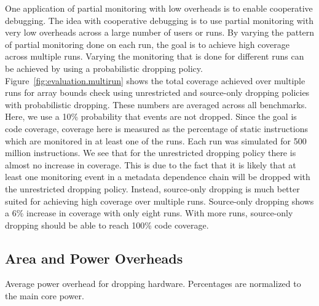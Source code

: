 One application of partial monitoring with low overheads is to enable
cooperative debugging. 
The idea with cooperative debugging is to use partial
monitoring with very low overheads across a large number of users or runs. By
varying the pattern of partial monitoring done on each run, the goal is to
achieve high coverage across multiple runs. Varying the monitoring that is
done for different runs can be achieved by using a probabilistic dropping policy.
Figure~\ref{fig:evaluation.multirun} shows the total
coverage achieved over multiple runs for array bounds check using
unrestricted and source-only dropping policies with probabilistic dropping.
These numbers are averaged across all benchmarks. Here, we use a 10\%
probability
that events are not dropped. Since the goal is code coverage, coverage here is
measured as the percentage of static instructions which are monitored in at
least one of the runs. Each run
was simulated for 500 million instructions. 
We see that for the unrestricted dropping policy there is almost no increase in
coverage.  This is due to the fact that it is likely that at least one
monitoring event in a metadata dependence chain will be dropped with the unrestricted dropping
policy. 
Instead, source-only
dropping is much better suited for achieving high coverage over multiple runs.
Source-only dropping shows a 6\% increase in coverage with only eight runs.
With more runs, source-only dropping should be able to
reach 100\% code coverage.

\subsection{Area and Power Overheads}

\begin{table}[tb]
  \begin{center}
    \vspace{-0.0in}
    \begin{footnotesize}
    
    \end{footnotesize}
    \caption{Average power overhead for dropping hardware. Percentages 
    are normalized to the main core power.}
    \vspace{-0.2in}
    \label{tab:evaluation.area_power}
  \end{center}
\end{table}

